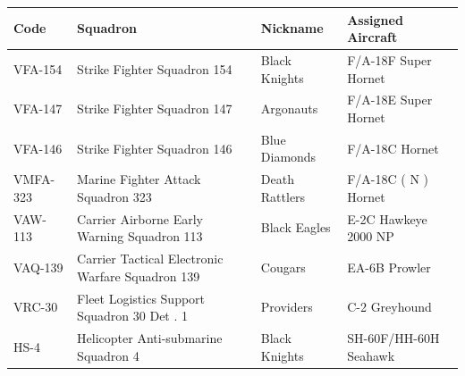 \documentclass{article}
\begin{document}
\begin{tabular}{llll}
\toprule
Code & Squadron & Nickname & Assigned Aircraft \\
\midrule
VFA-154 & Strike Fighter Squadron 154 & Black Knights & F/A-18F Super Hornet \\
VFA-147 & Strike Fighter Squadron 147 & Argonauts & F/A-18E Super Hornet \\
VFA-146 & Strike Fighter Squadron 146 & Blue Diamonds & F/A-18C Hornet \\
VMFA-323 & Marine Fighter Attack Squadron 323 & Death Rattlers & F/A-18C ( N ) Hornet \\
VAW-113 & Carrier Airborne Early Warning Squadron 113 & Black Eagles & E-2C Hawkeye 2000 NP \\
VAQ-139 & Carrier Tactical Electronic Warfare Squadron 139 & Cougars & EA-6B Prowler \\
VRC-30 & Fleet Logistics Support Squadron 30 Det . 1 & Providers & C-2 Greyhound \\
HS-4 & Helicopter Anti-submarine Squadron 4 & Black Knights & SH-60F/HH-60H Seahawk \\
\bottomrule
\end{tabular}
\end{document}
